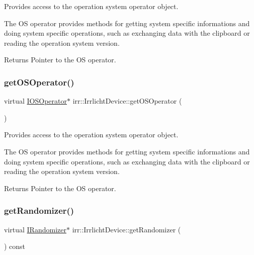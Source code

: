 Provides access to the operation system operator object. 

The OS operator provides methods for getting system specific informations and doing system specific operations, such as exchanging data with the clipboard or reading the operation system version. \begin{DoxyReturn}{Returns}
Pointer to the OS operator. 
\end{DoxyReturn}
\mbox{\label{classirr_1_1IrrlichtDevice_a3833250e8b0d7a94cd34b1e1809033ac}} 
\subsubsection{\texorpdfstring{get\+O\+S\+Operator()}{getOSOperator()}\hspace{0.1cm}{\footnotesize\ttfamily [2/2]}}
{\footnotesize\ttfamily virtual \hyperlink{classirr_1_1IOSOperator}{I\+O\+S\+Operator}$\ast$ irr\+::\+Irrlicht\+Device\+::get\+O\+S\+Operator (\begin{DoxyParamCaption}{ }\end{DoxyParamCaption})\hspace{0.3cm}{\ttfamily [pure virtual]}}



Provides access to the operation system operator object. 

The OS operator provides methods for getting system specific informations and doing system specific operations, such as exchanging data with the clipboard or reading the operation system version. \begin{DoxyReturn}{Returns}
Pointer to the OS operator. 
\end{DoxyReturn}
\mbox{\label{classirr_1_1IrrlichtDevice_aaba0cb18cac48e381d841ad763c7ea8b}} 
\subsubsection{\texorpdfstring{get\+Randomizer()}{getRandomizer()}\hspace{0.1cm}{\footnotesize\ttfamily [1/2]}}
{\footnotesize\ttfamily virtual \hyperlink{classirr_1_1IRandomizer}{I\+Randomizer}$\ast$ irr\+::\+Irrlicht\+Device\+::get\+Randomizer (\begin{DoxyParamCaption}{ }\end{DoxyParamCaption}) const\hspace{0.3cm}{\ttfamily [pure virtual]}}



